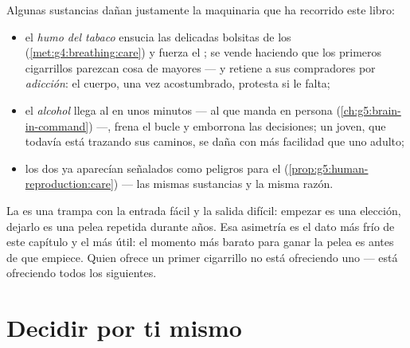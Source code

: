 \begin{proposition}\label{prop:g5:healthy-choices:substances}
Algunas sustancias dañan justamente la maquinaria que ha recorrido
este libro:
\begin{itemize}
  \item el \emph{humo del tabaco} ensucia las delicadas bolsitas de
        los  (\cref{met:g4:breathing:care}) y fuerza el
        ; se vende haciendo que los primeros cigarrillos
        parezcan cosa de mayores --- y retiene a sus compradores por
        \emph{adicción}: el cuerpo, una vez
        acostumbrado, protesta si le falta;
  \item el \emph{alcohol} llega al  en unos minutos --- al que
        manda en persona (\cref{ch:g5:brain-in-command}) ---, frena el
        bucle y emborrona las decisiones; un  joven, que
        todavía está trazando sus caminos, se daña con más facilidad
        que uno adulto;
  \item los dos ya aparecían señalados como peligros para el 
        (\cref{prop:g5:human-reproduction:care}) --- las mismas
        sustancias y la misma razón.
\end{itemize}
\end{proposition}
\admitted

\begin{remark}\label{rem:g5:healthy-choices:never}
La  es una trampa con la entrada fácil y la salida difícil:
empezar es una elección, dejarlo es una pelea repetida durante años.
Esa asimetría es el dato más frío de este capítulo y el más útil: el
momento más barato para ganar la pelea es antes de que empiece. Quien
ofrece un primer cigarrillo no está ofreciendo uno --- está ofreciendo
todos los siguientes.
\end{remark}

\section{Decidir por ti mismo}

